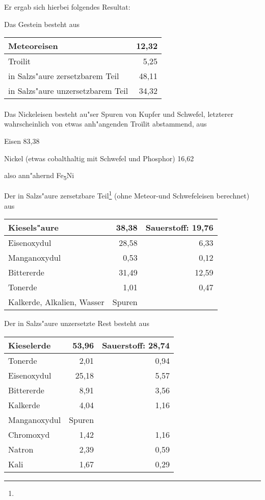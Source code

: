 \documentclass[a4paper, 11pt, oneside]{article}
\begin{document}
Er ergab sich hierbei folgendes Resultat:

Das Gestein besteht aus
\begin{center}
    \begin{tabular}{ |l|r| } 
    \hline
    Meteoreisen & 12,32\\\hline
    Troilit & 5,25\\\hline
    in Salzs"aure zersetzbarem Teil & 48,11\\\hline
    in Salzs"aure unzersetzbarem Teil & 34,32\\
    \hline
    \end{tabular}
\end{center}
\paragraph{}
Das Nickeleisen besteht au"ser Spuren von Kupfer und Schwefel, letzterer wahrscheinlich von etwas anh"angenden Troïlit abstammend, aus

Eisen 83,38

Nickel (etwas cobalthaltig mit Schwefel und Phosphor) 16,62

also ann"ahernd Fe\textsubscript{5}Ni

Der in Salzs"aure zersetzbare Teil\footnote{} (ohne Meteor-und Schwefeleisen berechnet) aus
\begin{center}
    \begin{tabular}{ |l|r|r| } 
    \hline
    Kiesels"aure & 38,38 & Sauerstoff: 19,76\\\hline
    Eisenoxydul & 28,58 & 6,33\\\hline
    Manganoxydul & 0,53 & 0,12\\\hline
    Bittererde & 31,49 & 12,59\\\hline
    Tonerde & 1,01 & 0,47\\\hline
    Kalkerde, Alkalien, Wasser & Spuren &\\
    \hline
    \end{tabular}
\end{center}
Der in Salzs"aure unzersetzte Rest besteht aus
\begin{center}
    \begin{tabular}{ |l|r|r| } 
    \hline
    Kieselerde & 53,96 & Sauerstoff: 28,74\\\hline
    Tonerde & 2,01 & 0,94\\\hline
    Eisenoxydul & 25,18 & 5,57\\\hline
    Bittererde & 8,91 & 3,56\\\hline
    Kalkerde & 4,04 & 1,16\\\hline
    Manganoxydul & Spuren &\\\hline
    Chromoxyd & 1,42 & 1,16\\\hline
    Natron & 2,39 & 0,59\\\hline
    Kali & 1,67 & 0,29\\
    \hline
    \end{tabular}
\end{center}
\end{document}
